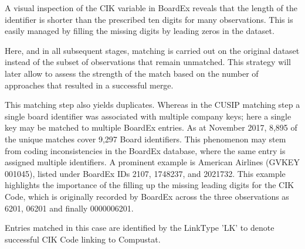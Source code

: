 \documentclass[12pt]{article}
\begin{document}
A visual inspection of the CIK variable in BoardEx reveals that the length of the identifier is shorter than the prescribed ten digits for many observations.
This is easily managed by filling the missing digits by leading zeros in the dataset.

Here, and in all subsequent stages, matching is carried out on the original dataset instead of the subset of observations that remain unmatched.
This strategy will later allow to assess the strength of the match based on the number of approaches that resulted in a successful merge.

This matching step also yields duplicates.
Whereas in the CUSIP matching step a single board identifier was associated with multiple company keys; here a single key may be matched to multiple BoardEx entries.
As at November 2017, 8,895 of the unique matches cover 9,297 Board identifiers.
This phenomenon may stem from coding inconsistencies in the BoardEx database, where the same entry is assigned multiple identifiers.
A prominent example is American Airlines (GVKEY 001045), listed under BoardEx IDs 2107, 1748237, and 2021732.
This example highlights the importance of the filling up the missing leading digits for the CIK Code, which is originally recorded by BoardEx across the three observations as 6201, 06201 and finally 0000006201.

\begin{center}

\end{center}

Entries matched in this case are identified by the LinkType 'LK' to denote successful CIK Code linking to Compustat.

\begin{comment}
\subsection{Ticker Symbol Linking}\label{sec:TICmatch}

The third matching stage involves the same process as before and employs the original dataset for linking.
The company's ticker symbol is the third and last available identifier that can be matched between the BoardEx and Compustat databases.
As before, care is taken that ticker symbols are matched for the specific year, as it is customary for tickers to be reused and recycled over time.

Entries matched in this case are identified by the $Match\_TIC$ dummy to note successful identification.
The code includes methods to obtain summary statistics to inspect the success of a matching stage for each merging strategy.
\end{comment}
\end{document}
